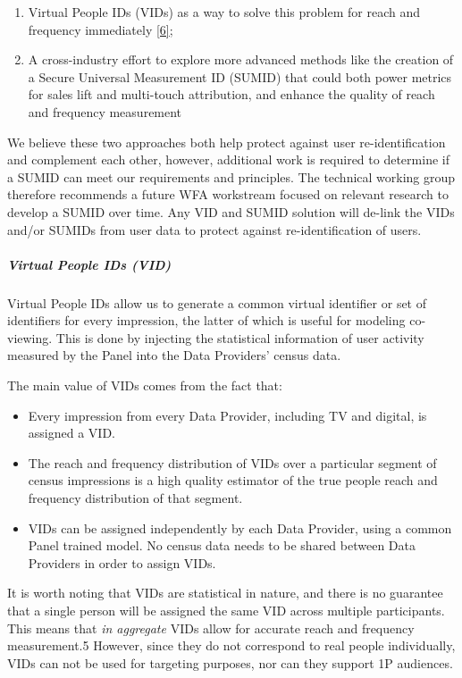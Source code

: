 \documentclass[]{article}
\providecommand{\tightlist}{%
  \setlength{\itemsep}{0pt}\setlength{\parskip}{0pt}}
\let\oldsubparagraph\subparagraph
\renewcommand{\subparagraph}[1]{\oldsubparagraph{#1}\mbox{}}
\begin{document}
\begin{enumerate}
\def\labelenumi{\arabic{enumi}.}
\tightlist
\item
  Virtual People IDs (VIDs) as a way to solve this problem for reach and frequency immediately \hyperref[ref:6]{[6]};
\item
  A cross-industry effort to explore more advanced methods like the creation of a Secure Universal Measurement ID (SUMID) that could both power metrics for sales lift and multi-touch attribution, and enhance the quality of reach and frequency measurement
\end{enumerate}

We believe these two approaches both help protect against user re-identification and complement each other, however, additional work is required to determine if a SUMID can meet our requirements and principles. The technical working group therefore recommends a future WFA workstream focused on relevant research to develop a SUMID over time. Any VID and SUMID solution will de-link the VIDs and/or SUMIDs from user data to protect against re-identification of users.

\subparagraph{Virtual People IDs (VID)}

Virtual People IDs allow us to generate a common virtual identifier or set of identifiers for every impression, the latter of which is useful for modeling co-viewing. This is done by injecting the statistical information of user activity measured by the Panel into the Data Providers' census data.

The main value of VIDs comes from the fact that:

\begin{itemize}
\tightlist
\item
  Every impression from every Data Provider, including TV and digital,
  is assigned a VID.
\item
  The reach and frequency distribution of VIDs over a particular segment
  of census impressions is a high quality estimator of the true people
  reach and frequency distribution of that segment.
\item
  VIDs can be assigned independently by each Data Provider, using a
  common Panel trained model. No census data needs to be shared between
  Data Providers in order to assign VIDs.
\end{itemize}

It is worth noting that VIDs are statistical in nature, and there is no guarantee that a single person will be assigned the same VID across multiple participants. This means that \emph{in aggregate} VIDs allow
for accurate reach and frequency measurement.5 However, since they do not correspond to real people individually, VIDs can not be used for targeting purposes, nor can they support 1P audiences.
\end{document}
